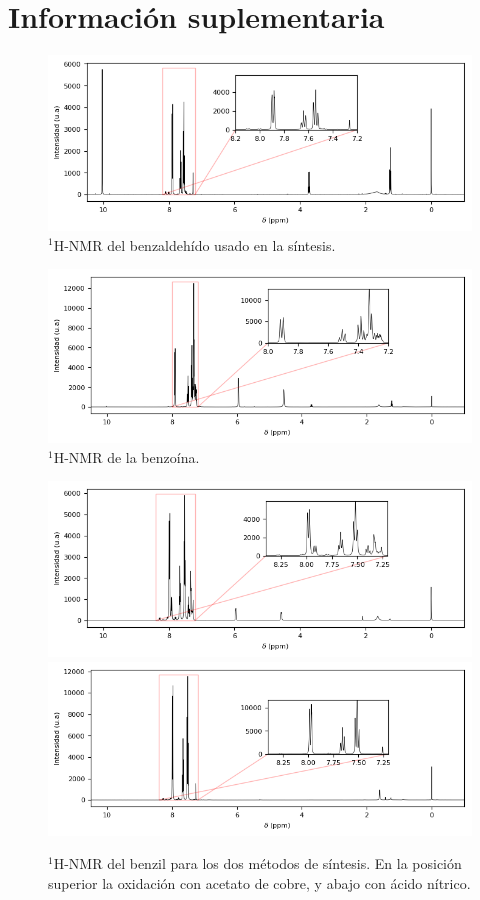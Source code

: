 \documentclass[fleqn,10pt]{SelfArx}
\begin{document}
\section{Informaci\'on suplementaria}\label{sec: complementaria}
\begin{figure}[h]
	\centering
	\includegraphics[width=\linewidth]{data/H-Benzaldehido}
	\caption{$^1$H-NMR del benzaldeh\'ido usado en la s\'intesis.}
	\label{fig: HNMR-Benzaldehido}
\end{figure}
\begin{figure}[h]
	\centering
	\includegraphics[width=\linewidth]{data/H-Benzoina}
	\caption{$^1$H-NMR de la benzo\'ina.}
	\label{fig: HNMR-Benzoina}
\end{figure}
\begin{figure}[h]
	\centering
	\includegraphics[width=\linewidth]{data/H-BenzilCu}
	\includegraphics[width=\linewidth]{data/H-BenzilHNO3}
	\caption{$^1$H-NMR del benzil para los dos m\'etodos de s\'intesis. En la posici\'on superior la oxidaci\'on con acetato de cobre, y abajo con \'acido n\'itrico.}
	\label{fig: HNMR-Benzil}
\end{figure}
\end{document}
